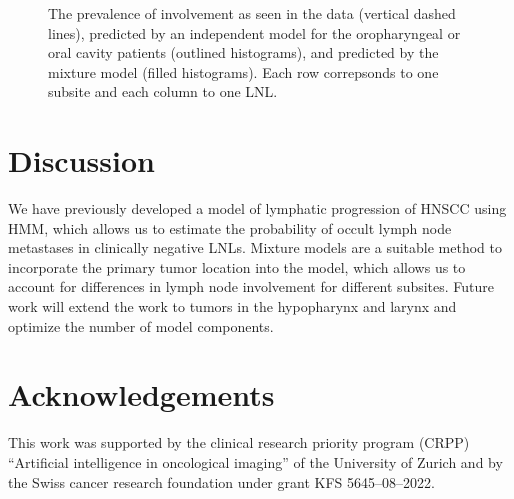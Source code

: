 \documentclass[11pt,twocolumn,twoside]{article}
\begin{document}
\begin{figure}


\caption{\label{fig-prevalence-comparison}The prevalence of involvement
as seen in the data (vertical dashed lines), predicted by an independent
model for the oropharyngeal or oral cavity patients (outlined
histograms), and predicted by the mixture model (filled histograms).
Each row correpsonds to one subsite and each column to one LNL.}

\end{figure}%

\section{Discussion}\label{sec-discussion}

We have previously developed a model of lymphatic progression of HNSCC
using HMM, which allows us to estimate the probability of occult lymph
node metastases in clinically negative LNLs. Mixture models are a
suitable method to incorporate the primary tumor location into the
model, which allows us to account for differences in lymph node
involvement for different subsites. Future work will extend the work to
tumors in the hypopharynx and larynx and optimize the number of model
components.

\section*{Acknowledgements}\label{acknowledgements}

This work was supported by the clinical research priority program (CRPP)
``Artificial intelligence in oncological imaging'' of the University of
Zurich and by the Swiss cancer research foundation under grant KFS
5645--08--2022.

\printbibliography
\end{document}
